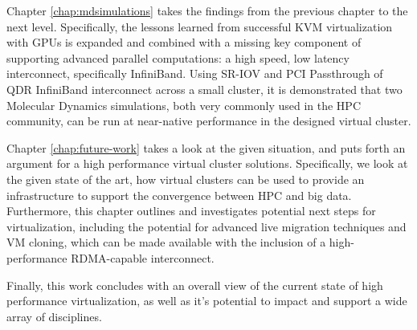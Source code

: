 Chapter \ref{chap:mdsimulations} takes the findings from the previous chapter to the next level. Specifically, the lessons learned from successful KVM virtualization with GPUs is expanded and combined with a missing key component of supporting advanced parallel computations: a high speed, low latency interconnect, specifically InfiniBand. Using SR-IOV and PCI Passthrough of QDR InfiniBand interconnect across a small cluster, it is demonstrated that two Molecular Dynamics simulations, both very commonly used in the HPC community, can be run at near-native performance in the designed virtual cluster.

Chapter \ref{chap:future-work} takes a look at the given situation, and puts forth an argument for a high performance virtual cluster solutions. Specifically, we look at the given state of the art, how virtual clusters can be used to provide an infrastructure to support the convergence between HPC and big data. Furthermore, this chapter outlines and investigates potential next steps for virtualization, including the potential for advanced live migration techniques and VM cloning, which can be made available with the inclusion of a high-performance RDMA-capable interconnect. 

Finally, this work concludes with an overall view of the current state of high performance virtualization, as well as it's potential to impact and support a wide array of disciplines. 



